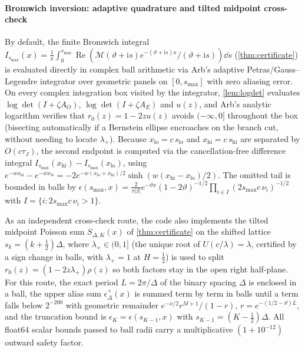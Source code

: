 \paragraph{Bromwich inversion: adaptive quadrature and tilted midpoint cross-check} By default, the finite Bromwich
integral $I_{s_{\max}}(x)=\frac1\pi\int_0^{s_{\max}}\operatorname{Re}(\mathcal M(\vartheta+\mathrm is)e^{-(\vartheta+\mathrm is)x}/(\vartheta+\mathrm is))\dd s$
(\cref{thm:certificate}) is evaluated directly in complex ball arithmetic via Arb's adaptive Petras/Gauss--Legendre
integrator \citep{Joh18} over geometric panels on $[0,s_{\max}]$ with zero aliasing error. On every complex integration
box visited by the integrator, \cref{lem:logdet} evaluates $\log\det(I+\zeta A_O)$, $\log\det(I+\zeta A_E)$ and $u(z)$,
and Arb's analytic logarithm verifies that $r_0(z)=1-2zu(z)$ avoids $(-\infty,0]$ throughout the box (bisecting
automatically if a Bernstein ellipse encroaches on the branch cut, without needing to locate $\lambda_+$). Because
$x_{\mathrm{lo}}=c\,s_{\mathrm{lo}}$ and $x_{\mathrm{hi}}=c\,s_{\mathrm{hi}}$ are separated by $O(c\tau_J)$, the second
endpoint is computed via the cancellation-free difference integral
$I_{s_{\max}}(x_{\mathrm{hi}})-I_{s_{\max}}(x_{\mathrm{lo}})$, using
$e^{-wx_{\mathrm{hi}}}-e^{-wx_{\mathrm{lo}}}=-2e^{-w(x_{\mathrm{lo}}+x_{\mathrm{hi}})/2}\sinh(w(x_{\mathrm{hi}}-x_{\mathrm{lo}})/2)$.
The omitted tail is bounded in balls by $\epsilon(s_{\max},x)=\frac{2}{\pi|I|}e^{-\vartheta x}(1-2\vartheta)^{-1/2}\prod_{i\in I}(2s_{\max}c\,\nu_i)^{-1/2}$
with $I=\{i:2s_{\max}c\,\nu_i>1\}$.

As an independent cross-check route, the code also implements the tilted midpoint Poisson sum $S_{\Delta,K}(x)$ of
\cref{thm:certificate} on the shifted lattice $s_k=(k+\frac12)\Delta$, where $\lambda_+\in(0,1]$ (the unique root of
$U(c/\lambda)=\lambda$, certified by a sign change in balls, with $\lambda_+=1$ at $H=\frac12$) is used to split
$r_0(z)=(1-2z\lambda_+)\rho(z)$ so both factors stay in the open right half-plane. For this route, the exact period
$L=2\pi/\Delta$ of the binary spacing $\Delta$ is enclosed in a ball, the upper alias sum $\epsilon_\Delta^+(x)$ is
summed term by term in balls until a term falls below $2^{-200}$ with geometric remainder $e^{-x/2}r^{M+1}/(1-r)$,
$r=e^{-(1/2-\vartheta)L}$, and the truncation bound is $\epsilon_K=\epsilon(s_{K-1},x)$ with $s_{K-1}=(K-\frac12)\Delta$.
All float64 scalar bounds passed to ball radii carry a multiplicative $(1+10^{-12})$ outward safety factor.

